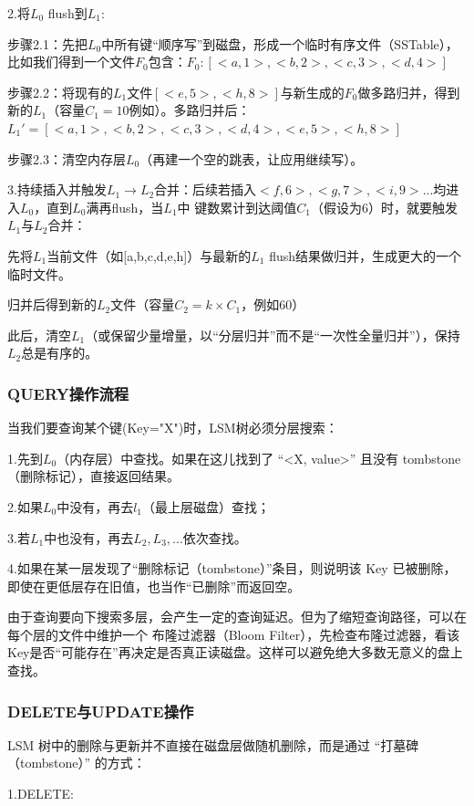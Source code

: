 \noindent 2.将$L_0$ flush到$L_1$: 

步骤2.1：先把$L_0$中所有键“顺序写”到磁盘，形成一个临时有序文件（SSTable），比如我们得到一个文件$F_0$包含：$F_0:[<a,1>,<b,2>,<c,3>,<d,4>]$

步骤2.2：将现有的$L_1$文件$[<e,5>,<h,8>]$与新生成的$F_0$做多路归并，得到新的$L_1$（容量$C_1=10$例如）。多路归并后：$L_1'=[<a,1>,<b,2>,<c,3>,<d,4>,<e,5>,<h,8>]$

步骤2.3：清空内存层$L_0$（再建一个空的跳表，让应用继续写）。

\noindent 3.持续插入并触发$L_1\to L_2$合并：后续若插入$<f,6>,<g,7>,<i,9>...$均进入$L_0$，直到$L_0$满再flush，当$L_1$中
键数累计到达阈值$C_1$（假设为6）时，就要触发$L_1$与$L_2$合并：

先将$L_1$当前文件（如[a,b,c,d,e,h]）与最新的$L_1$ flush结果做归并，生成更大的一个临时文件。

归并后得到新的$L_2$文件（容量$C_2=k\times C_1$，例如60）

此后，清空$L_1$（或保留少量增量，以“分层归并”而不是“一次性全量归并”），保持$L_2$总是有序的。

\subsubsection{QUERY操作流程}

当我们要查询某个键(Key="X")时，LSM树必须分层搜索：

1.先到$L_0$（内存层）中查找。如果在这儿找到了 “<X, value>” 且没有 tombstone（删除标记），直接返回结果。

2.如果$L_0$中没有，再去$l_1$（最上层磁盘）查找；

3.若$L_1$中也没有，再去$L_2,L_3,...$依次查找。

4.如果在某一层发现了“删除标记（tombstone）”条目，则说明该 Key 已被删除，即使在更低层存在旧值，也当作“已删除”而返回空。

由于查询要向下搜索多层，会产生一定的查询延迟。但为了缩短查询路径，可以在每个层的文件中维护一个 布隆过滤器（Bloom Filter），先检查布隆过滤器，看该Key是否“可能存在”再决定是否真正读磁盘。这样可以避免绝大多数无意义的盘上查找。

\subsubsection{DELETE与UPDATE操作}

LSM 树中的删除与更新并不直接在磁盘层做随机删除，而是通过 “打墓碑（tombstone）” 的方式：

\noindent 1.DELETE:

